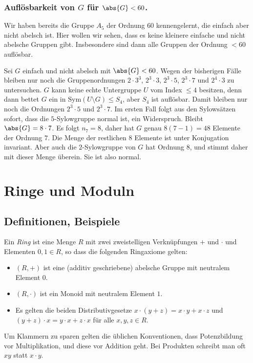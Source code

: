 \documentclass[12pt,a4paper,twoside]{article}
\newcommand{\ei}[1]{\emph{#1}\index{#1}}
\begin{document}
\subsubsection{Aufl\"osbarkeit von $G$ f\"ur $\abs{G}<60$.}
Wir haben bereits die Gruppe $A_5$ der Ordnung $60$ kennengelernt, die einfach
aber nicht abelsch ist. Hier wollen wir sehen, dass es keine kleinere einfache
und nicht abelsche Gruppen gibt. Insbesondere sind dann alle Gruppen der
Ordnung $<60$ aufl\"osbar.

Sei $G$ einfach und nicht abelsch mit $\abs{G}<60$. Wegen der bisherigen
F\"alle bleiben nur noch die Gruppenordnungen $2\cdot 3^3$, $2^3\cdot 3$,
$2^3\cdot 5$, $2^3\cdot 7$ und $2^4\cdot 3$ zu untersuchen. $G$ kann keine
echte Untergruppe $U$ vom Index $\le4$ besitzen, denn dann bettet $G$ ein in
$\text{Sym}(U\setminus G)\le S_4$, aber $S_4$ ist aufl\"osbar. Damit bleiben
nur noch die Ordnungen $2^3\cdot 5$ und $2^3\cdot 7$. Im ersten Fall folgt aus
den Sylows\"atzen sofort, dass die $5$-Sylowgruppe normal ist, ein
Widerspruch. Bleibt $\abs{G}=8\cdot 7$. Es folgt $n_7=8$, daher hat $G$ genau
$8(7-1)=48$ Elemente der Ordnung $7$. Die Menge der restlichen $8$ Elemente
ist unter Konjugation invariant. Aber auch die $2$-Sylowgruppe von $G$ hat
Ordnung $8$, und stimmt daher mit dieser Menge \"uberein. Sie ist also normal.
\section{Ringe und Moduln}
\subsection{Definitionen, Beispiele}
Ein \ei{Ring} ist eine Menge $R$ mit zwei zweistelligen Verkn\"upfungen $+$
und $\cdot$ und Elementen $0,1\in R$, so dass die folgenden Ringaxiome gelten:
\begin{itemize}
\item $(R,+)$ ist eine (additiv geschriebene) abelsche Gruppe mit neutralem
  Element $0$.
\item $(R,\cdot)$ ist ein Monoid mit neutralem Element $1$.
\item Es gelten die beiden Distributivgesetze $x\cdot(y+z)=x\cdot y+x\cdot z$
  und $(y+z)\cdot x=y\cdot x+z\cdot x$ f\"ur alle $x,y,z\in R$.
\end{itemize}
Um Klammern zu sparen gelten die \"ublichen Konventionen, dass Potenzbildung
vor Multiplikation, und diese vor Addition geht. Bei Produkten schreibt man
oft $xy$ statt $x\cdot y$.
\end{document}
